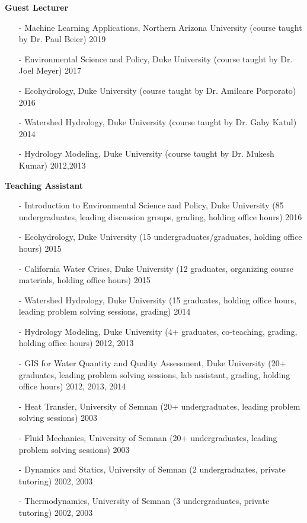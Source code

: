 \documentclass[10pt]{article}
\newenvironment{changemargin}[2]{%
  \begin{list}{}{%
 \setlength{\topsep}{0pt}%
 \setlength{\leftmargin}{#1}%
 \setlength{\rightmargin}{#2}%
 \setlength{\listparindent}{\parindent}%
 \setlength{\itemindent}{\parindent}%
 \setlength{\parsep}{\parskip}%
  }%
  \item[]}{\end{list}
}
\newenvironment{body} {
  \vspace*{-2pt}
  \begin{changemargin}{-0.5in}{-0.5in}
}
{\end{changemargin}
}
\begin{document}
\begin{body}
  \textbf {Guest Lecturer}\\
  \vspace*{-4pt}
  \begin{itemize} \itemsep -0pt
    \item[-]Machine Learning Applications, Northern Arizona University  (course taught by Dr. Paul Beier) \hfill {2019}
    \item[-]Environmental Science and Policy, Duke University (course taught by Dr. Joel Meyer)  \hfill {2017}
    \item[-]Ecohydrology, Duke University (course taught by Dr. Amilcare Porporato)  \hfill {2016}
    \item[-]Watershed Hydrology, Duke University (course taught by Dr. Gaby Katul)  \hfill {2014}
    \item[-]Hydrology Modeling, Duke University (course taught by Dr. Mukesh Kumar)  \hfill {2012,2013}
  \end{itemize}
  \medskip


  \textbf {Teaching Assistant}\\
  \vspace*{-4pt}
  \begin{itemize} \itemsep -0pt
    \item[-]Introduction to Environmental Science and Policy, Duke University (85 undergraduates, leading discussion groups, grading, holding office hours) \hfill {2016}
    \item[-]Ecohydrology, Duke University (15 undergraduates/graduates, holding office hours) \hfill {2015}
    \item[-]California Water Crises, Duke University (12 graduates, organizing course materials, holding office hours) \hfill {2015}
    \item[-]Watershed Hydrology, Duke University (15 graduates, holding office hours, leading problem solving sessions, grading) \hfill {2014}
    \item[-]Hydrology Modeling, Duke University (4+ graduates, co-teaching, grading, holding office hours) \hfill {2012, 2013}
    \item[-]GIS for Water Quantity and Quality Assessment, Duke University (20+ graduates, leading problem solving sessions, lab assistant, grading, holding office hours) \hfill {2012, 2013, 2014}
    \item[-]Heat Transfer, University of Semnan  (20+ undergraduates,  leading problem solving sessions) \hfill {2003}
    \item[-]Fluid Mechanics, University of Semnan  (20+ undergraduates,  leading problem solving sessions) \hfill {2003}
    \item[-]Dynamics and Statics, University of Semnan (2 undergraduates, private tutoring) \hfill {2002, 2003}
    \item[-]Thermodynamics, University of Semnan  (3 undergraduates, private tutoring) \hfill {2002, 2003}
  \end{itemize}

  \medskip
\end{body}
\medskip
\end{document}

